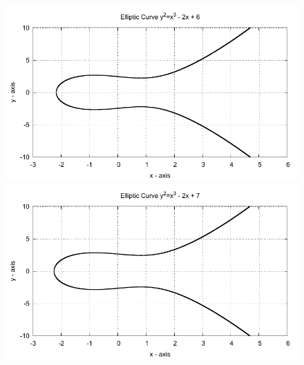 \begin{figure}[!htbp]

  \begin{minipage}{0.3\textwidth} \centering
    \includegraphics{../Images/ecc_plot/28}
  \end{minipage}
  \begin{minipage}{0.3\textwidth} \centering
    \includegraphics{../Images/ecc_plot/29}
  \end{minipage}
\end{figure}

